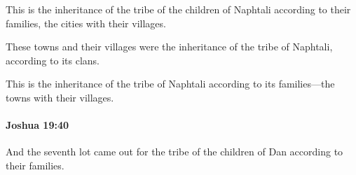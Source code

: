 			\begin{versebox}
					\item[BHS] 
					\item[ASV] This is the inheritance of the tribe of the children of Naphtali according to their families, the cities with their villages.
					\item[NIV] These towns and their villages were the inheritance of the tribe of Naphtali, according to its clans.
					\item[NRSV] This is the inheritance of the tribe of Naphtali according to its families—the towns with their villages.
			\end{versebox}

		\paragraph{Joshua 19:40} %
			\label{JOSHUA-19-40}

			And the seventh lot came out for the tribe of the children of Dan according to their families.

